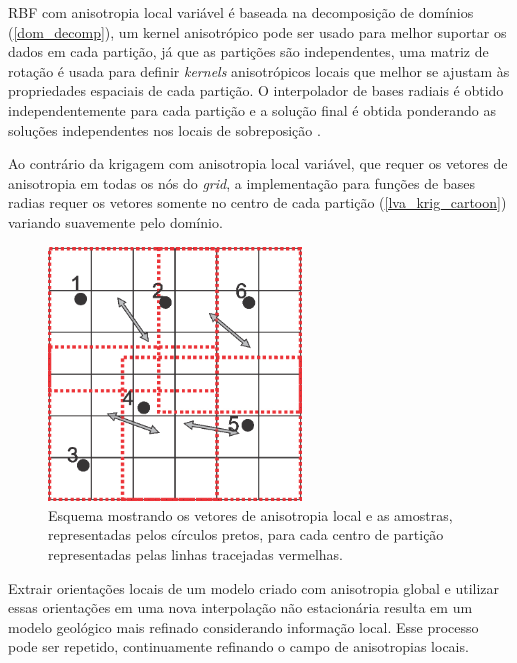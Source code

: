 
RBF com anisotropia local variável é baseada na decomposição de domínios (\autoref{dom_decomp}), um kernel anisotrópico pode ser usado para melhor suportar os dados em cada partição, já que as partições são independentes, uma matriz de rotação é usada para definir \textit{kernels} anisotrópicos locais que melhor se ajustam às propriedades espaciais de cada partição. O interpolador de bases radiais é obtido independentemente para cada partição e a solução final é obtida ponderando as soluções independentes nos locais de sobreposição \cite{martin2017implicitmodeling}.

Ao contrário da krigagem com anisotropia local variável, que requer os vetores de anisotropia em todas os nós do \textit{grid}, a implementação para funções de bases radias requer os vetores somente no centro de cada partição (\autoref{lva_krig_cartoon}) variando suavemente pelo domínio.

\begin{figure}[H]
\caption{\label{lva_rbf+cartoon} Esquema mostrando os vetores de anisotropia local e as amostras, representadas pelos círculos pretos, para cada centro de partição representadas pelas linhas tracejadas vermelhas.}
	\centering
		\includegraphics[width=0.6\textwidth]{capitulo_2/imagens/lvarbf.jpg}
\end{figure}

Extrair orientações locais de um modelo criado com anisotropia global e utilizar essas orientações em uma nova interpolação não estacionária resulta em um modelo geológico mais refinado considerando informação local. Esse processo pode ser repetido, continuamente refinando o campo de anisotropias locais. 


